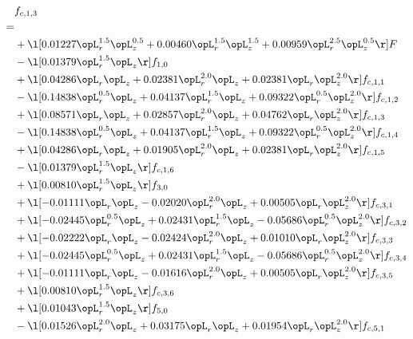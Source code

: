 \begin{alignat}{2} 
\label{eq:f_13_1} 
& f_{c,1,3} \nonumber \\ 
 = \\ 
& + \l[  0.01227 \opL_r^{1.5} \opL_z^{0.5} +  0.00460 \opL_r^{1.5} \opL_z^{1.5} +  0.00959 \opL_r^{2.5} \opL_z^{0.5}  \r] F \nonumber \\ 
& - \l[  0.01379 \opL_r^{1.5} \opL_z  \r] f_{1,0} \nonumber \\ 
& + \l[  0.04286 \opL_r \opL_z +  0.02381 \opL_r^{2.0} \opL_z +  0.02381 \opL_r \opL_z^{2.0}  \r] f_{c,1,1} \nonumber \\ 
& - \l[  0.14838 \opL_r^{0.5} \opL_z +  0.04137 \opL_r^{1.5} \opL_z +  0.09322 \opL_r^{0.5} \opL_z^{2.0}  \r] f_{c,1,2} \nonumber \\ 
& + \l[  0.08571 \opL_r \opL_z +  0.02857 \opL_r^{2.0} \opL_z +  0.04762 \opL_r \opL_z^{2.0}  \r] f_{c,1,3} \nonumber \\ 
& - \l[  0.14838 \opL_r^{0.5} \opL_z +  0.04137 \opL_r^{1.5} \opL_z +  0.09322 \opL_r^{0.5} \opL_z^{2.0}  \r] f_{c,1,4} \nonumber \\ 
& + \l[  0.04286 \opL_r \opL_z +  0.01905 \opL_r^{2.0} \opL_z +  0.02381 \opL_r \opL_z^{2.0}  \r] f_{c,1,5} \nonumber \\ 
& - \l[  0.01379 \opL_r^{1.5} \opL_z  \r] f_{c,1,6} \nonumber \\ 
& + \l[  0.00810 \opL_r^{1.5} \opL_z  \r] f_{3,0} \nonumber \\ 
& + \l[  -0.01111 \opL_r \opL_z   -0.02020 \opL_r^{2.0} \opL_z +  0.00505 \opL_r \opL_z^{2.0}  \r] f_{c,3,1} \nonumber \\ 
& + \l[  -0.02445 \opL_r^{0.5} \opL_z +  0.02431 \opL_r^{1.5} \opL_z   -0.05686 \opL_r^{0.5} \opL_z^{2.0}  \r] f_{c,3,2} \nonumber \\ 
& + \l[  -0.02222 \opL_r \opL_z   -0.02424 \opL_r^{2.0} \opL_z +  0.01010 \opL_r \opL_z^{2.0}  \r] f_{c,3,3} \nonumber \\ 
& + \l[  -0.02445 \opL_r^{0.5} \opL_z +  0.02431 \opL_r^{1.5} \opL_z   -0.05686 \opL_r^{0.5} \opL_z^{2.0}  \r] f_{c,3,4} \nonumber \\ 
& + \l[  -0.01111 \opL_r \opL_z   -0.01616 \opL_r^{2.0} \opL_z +  0.00505 \opL_r \opL_z^{2.0}  \r] f_{c,3,5} \nonumber \\ 
& + \l[  0.00810 \opL_r^{1.5} \opL_z  \r] f_{c,3,6} \nonumber \\ 
& + \l[  0.01043 \opL_r^{1.5} \opL_z  \r] f_{5,0} \nonumber \\ 
& - \l[  0.01526 \opL_r^{2.0} \opL_z +  0.03175 \opL_r \opL_z +  0.01954 \opL_r \opL_z^{2.0}  \r] f_{c,5,1} \nonumber \\ 

\end{alignat}
